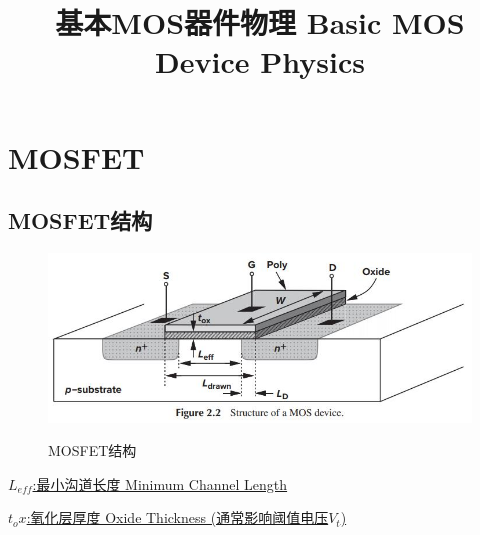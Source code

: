 \documentclass[]{ctexart}
\title{基本MOS器件物理 Basic MOS Device Physics}
\begin{document}
\section{MOSFET}
\subsection{MOSFET结构}
    \begin{figure}[ht]
        \centering
        \includegraphics[scale=0.6]{MOSFET_Strcture}
        \label{图1}
        \caption{MOSFET结构}
    \end{figure}
    
    \underline{$L_{eff}$:最小沟道长度 Minimum Channel Length}
    
    \underline{$t_ox$:氧化层厚度 Oxide Thickness (通常影响阈值电压$V_t$)}
\end{document}
